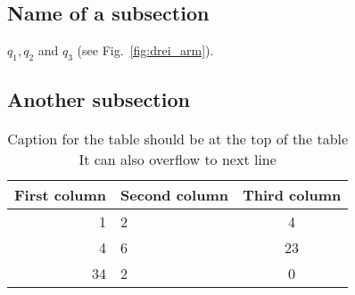 \subsection{Name of a subsection}
\label{subsec:xxxxx}
%
 $q_1,q_2$ and
$q_3$ (see Fig.~\ref{fig:drei_arm}).
%
\subsection{Another subsection}





%
\begin{table}[!t]
  \begin{center}
    \leavevmode
    \caption[To appear in the list of tables]{Caption for the table should be at the top of the table\\It can also overflow to next line}   
     \begin{tabular}{rlc}\hline
      First column & Second column & Third column \\ \hline
      1 & 2 & 4\\
      4 & 6 & 23\\
      34 & 2 & 0 \\ \hline
    \end{tabular}
    \label{tab:zweiarmsystemtab}
  \end{center}
\end{table}
%
